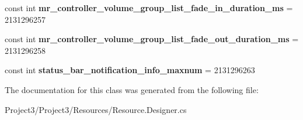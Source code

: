 \begin{DoxyCompactItemize}
\item 
\mbox{\label{classXaria_1_1Resource_1_1Integer_a3b54fe949687b8810a8602031c67fd5c}} 
const int {\bfseries mr\+\_\+controller\+\_\+volume\+\_\+group\+\_\+list\+\_\+fade\+\_\+in\+\_\+duration\+\_\+ms} = 2131296257
\item 
\mbox{\label{classXaria_1_1Resource_1_1Integer_a5c1b632ad15b0f34d57f665ba1e7e77e}} 
const int {\bfseries mr\+\_\+controller\+\_\+volume\+\_\+group\+\_\+list\+\_\+fade\+\_\+out\+\_\+duration\+\_\+ms} = 2131296258
\item 
\mbox{\label{classXaria_1_1Resource_1_1Integer_a0c5fa25a322e3855db83a98bfd26963b}} 
const int {\bfseries status\+\_\+bar\+\_\+notification\+\_\+info\+\_\+maxnum} = 2131296263
\end{DoxyCompactItemize}


The documentation for this class was generated from the following file\+:\begin{DoxyCompactItemize}
\item 
Project3/\+Project3/\+Resources/Resource.\+Designer.\+cs\end{DoxyCompactItemize}
